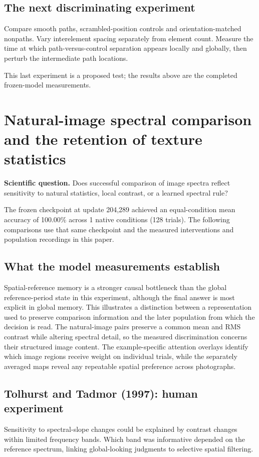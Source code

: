 \documentclass[11pt]{article}
\begin{document}
\subsection{The next discriminating experiment}
Compare smooth paths, scrambled-position controls and orientation-matched nonpaths. Vary interelement spacing separately from element count. Measure the time at which path-versus-control separation appears locally and globally, then perturb the intermediate path locations.

This last experiment is a proposed test; the results above are the completed frozen-model measurements.
\clearpage\section{Natural-image spectral comparison and the retention of texture statistics}
\textbf{Scientific question.} Does successful comparison of image spectra reflect sensitivity to natural statistics, local contrast, or a learned spectral rule?

The frozen checkpoint at update 204,289 achieved an equal-condition mean accuracy of 100.00\% across 1 native conditions (128 trials). The following comparisons use that same checkpoint and the measured interventions and population recordings in this paper.

\subsection{What the model measurements establish}
Spatial-reference memory is a stronger causal bottleneck than the global reference-period state in this experiment, although the final answer is most explicit in global memory. This illustrates a distinction between a representation used to preserve comparison information and the later population from which the decision is read. The natural-image pairs preserve a common mean and RMS contrast while altering spectral detail, so the measured discrimination concerns their structured image content. The example-specific attention overlays identify which image regions receive weight on individual trials, while the separately averaged maps reveal any repeatable spatial preference across photographs.

\subsection{Tolhurst and Tadmor (1997): human experiment}
Sensitivity to spectral-slope changes could be explained by contrast changes within limited frequency bands. Which band was informative depended on the reference spectrum, linking global-looking judgments to selective spatial filtering. \cite{bio_tolhurst97}
\end{document}
